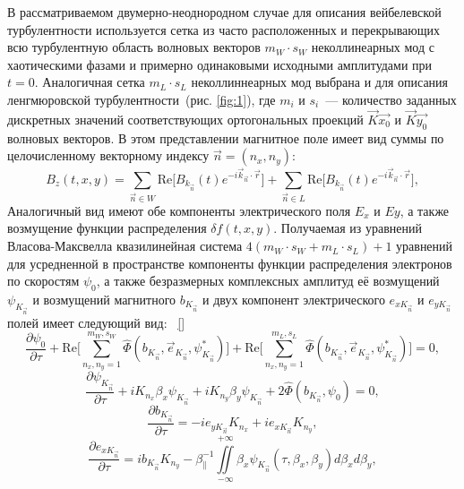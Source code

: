 В рассматриваемом двумерно-неоднородном случае для описания вейбелевской турбулентности используется сетка из часто расположенных и перекрывающих всю турбулентную область волновых векторов $m_W \cdot s_W$ неколлинеарных мод с хаотическими фазами и примерно одинаковыми исходными амплитудами при $t=0$. Аналогичная сетка $m_L \cdot s_L$ неколлиннеарных мод выбрана и для описания ленгмюровской турбулентности~(рис. \ref{fig:1}), где $m_i$ и $s_i$~--- количество заданных дискретных значений соответствующих ортогональных проекций $\vec{K}\vec{x_0}$ и $\vec{K}\vec{y_0}$ волновых векторов. В этом представлении магнитное поле имеет вид суммы по целочисленному векторному индексу $\vec{n}=(n_x,n_y)$:
\begin{equation}
B_z(t,x,y)
=
\sum_{\vec n\in W}\mathrm{Re}\bigl[B_{k_{\vec n}}(t)e^{-i\vec k_{\vec n}\cdot\vec r}\bigr]
+
\sum_{\vec n\in L}\mathrm{Re}\bigl[B_{k_{\vec n}}(t)e^{-i\vec k_{\vec n}\cdot\vec r}\bigr],
\end{equation}
Аналогичный вид имеют обе компоненты электрического поля $E_x$ и $Ey$, а также возмущение 
функции распределения $\delta f(t,x,y)$. Получаемая из уравнений Власова-Максвелла квазилинейная система  $4(m_W\cdot s_W+m_L\cdot s_L)+1$ уравнений для усредненной в пространстве компоненты функции распределения электронов по скоростям $\psi_0$,  а также безразмерных комплексных амплитуд её возмущений $\psi_{K_{\vec{n}}}$ и возмущений магнитного $b_{K_{\vec{n}}}$ и двух компонент электрического  $e_{x{K_{\vec{n}}}}$ и $e_{y{K_{\vec{n}}}}$ полей имеет следующий вид:
~\ref{} 
\begin{equation}
\label{eq14}
    \dfrac{\partial \psi_0}{\partial \tau} 
    + \mathrm{Re}\Biggl[\sum\limits^{m_W,s_W}_{n_x,n_y=1} \hat \Phi(b_{K_{\vec{n}}},\overrightarrow{e}_{K_{\vec{n}}},\psi_{K_{\vec{n}}}^*) 
     \Biggr]+ \mathrm{Re}\Biggl[\sum\limits^{m_L,s_L}_{n_x,n_y=1} \hat \Phi(b_{K_{\vec{n}}},\overrightarrow{e}_{K_{\vec{n}}},\psi_{K_{\vec{n}}}^*) 
     \Biggr]=0,
\end{equation}
\begin{equation}
    \label{eq15}
    \dfrac{\partial \psi_{K_{\vec{n}}}}{\partial \tau}+iK_{n_x}\beta_x\psi_{K_{\vec{n}}}+iK_{n_y}\beta_y\psi_{K_{\vec{n}}}+2\hat \Phi(b_{K_{\vec{n}}},\psi_0)=0,
\end{equation}
\begin{equation}
    \dfrac{\partial b_{K_{\vec{n}}}}{\partial \tau}=-ie_{y{K_{\vec{n}}}}K_{n_x}+ie_{x{K_{\vec{n}}}}K_{n_y},
\end{equation}
\begin{equation}
    \dfrac{\partial e_{x{K_{\vec{n}}}}}{\partial \tau}=ib_{K_{\vec{n}}}K_{n_y}-\beta_{\|}^{-1}\iint\limits^{+\infty}_{-\infty}\beta_x\psi_{K_{\vec{n}}}(\tau,\beta_x,\beta_y)d\beta_xd\beta_y,
\end{equation}
